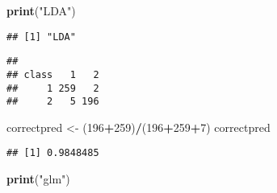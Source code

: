 \documentclass[]{article}
\newenvironment{Shaded}{\begin{snugshade}}{\end{snugshade}}
\newcommand{\KeywordTok}[1]{\textcolor[rgb]{0.13,0.29,0.53}{\textbf{#1}}}
\newcommand{\DataTypeTok}[1]{\textcolor[rgb]{0.13,0.29,0.53}{#1}}
\newcommand{\DecValTok}[1]{\textcolor[rgb]{0.00,0.00,0.81}{#1}}
\newcommand{\StringTok}[1]{\textcolor[rgb]{0.31,0.60,0.02}{#1}}
\newcommand{\CommentTok}[1]{\textcolor[rgb]{0.56,0.35,0.01}{\textit{#1}}}
\newcommand{\OperatorTok}[1]{\textcolor[rgb]{0.81,0.36,0.00}{\textbf{#1}}}
\newcommand{\NormalTok}[1]{#1}
\begin{document}
\begin{Shaded}
\begin{Highlighting}[]
\KeywordTok{print}\NormalTok{(}\StringTok{"LDA"}\NormalTok{)}
\end{Highlighting}
\end{Shaded}

\begin{verbatim}
## [1] "LDA"
\end{verbatim}

\begin{Shaded}
\end{Shaded}

\begin{verbatim}
##      
## class   1   2
##     1 259   2
##     2   5 196
\end{verbatim}

\begin{Shaded}
\begin{Highlighting}[]
\NormalTok{correctpred <-}\StringTok{ }\NormalTok{(}\DecValTok{196}\OperatorTok{+}\DecValTok{259}\NormalTok{)}\OperatorTok{/}\NormalTok{(}\DecValTok{196}\OperatorTok{+}\DecValTok{259}\OperatorTok{+}\DecValTok{7}\NormalTok{)}
\NormalTok{correctpred}
\end{Highlighting}
\end{Shaded}

\begin{verbatim}
## [1] 0.9848485
\end{verbatim}

\begin{Shaded}
\begin{Highlighting}[]
\KeywordTok{print}\NormalTok{(}\StringTok{"glm"}\NormalTok{)}
\end{Highlighting}
\end{Shaded}
\end{document}

